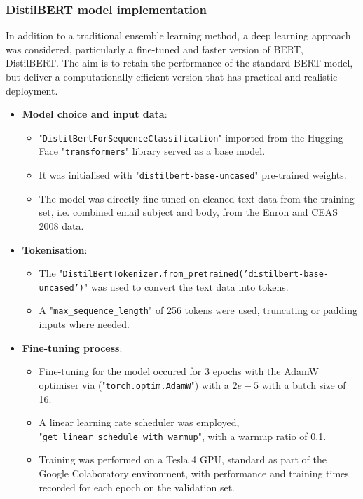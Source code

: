 
\subsubsection*{DistilBERT model implementation}
In addition to a traditional ensemble learning method, a deep learning approach was considered, particularly a fine-tuned and faster version of BERT, DistilBERT. The aim is to retain the performance of the standard BERT model, but deliver a computationally efficient version that has practical and realistic deployment.

\begin{itemize}
  \item \textbf{Model choice and input data}:
  \begin{itemize}
    \item "\texttt{DistilBertForSequenceClassification}" imported from the Hugging Face "\texttt{transformers}" library served as a base model.
    \item It was initialised with "\texttt{distilbert-base-uncased}" pre-trained weights.
    \item The model was directly fine-tuned on cleaned-text data from the training set, i.e. combined email subject and body, from the Enron and CEAS 2008 data.
  \end{itemize}
  \item \textbf{Tokenisation}:
  \begin{itemize}
    \item The "\texttt{DistilBertTokenizer.from\_pretrained('distilbert-base-uncased')}" was used to convert the text data into tokens.
    \item A "\texttt{max\_sequence\_length}" of 256 tokens were used, truncating or padding inputs where needed.
  \end{itemize}
  \item \textbf{Fine-tuning process}:
  \begin{itemize}
    \item Fine-tuning for the model occured for 3 epochs with the AdamW optimiser via ("\texttt{torch.optim.AdamW}") with a $2e-5$ with a batch size of 16.
    \item A linear learning rate scheduler was employed, "\texttt{get\_linear\_schedule\_with\_warmup}", with a warmup ratio of 0.1.
    \item Training was performed on a Tesla 4 GPU, standard as part of the Google Colaboratory environment, with performance and training times recorded for each epoch on the validation set.
  \end{itemize}
\end{itemize}
